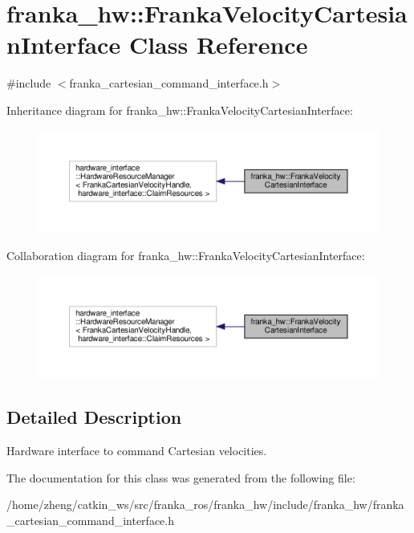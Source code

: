 \hypertarget{classfranka__hw_1_1_franka_velocity_cartesian_interface}{}\section{franka\+\_\+hw\+:\+:Franka\+Velocity\+Cartesian\+Interface Class Reference}
\label{classfranka__hw_1_1_franka_velocity_cartesian_interface}


{\ttfamily \#include $<$franka\+\_\+cartesian\+\_\+command\+\_\+interface.\+h$>$}



Inheritance diagram for franka\+\_\+hw\+:\+:Franka\+Velocity\+Cartesian\+Interface\+:
\nopagebreak
\begin{figure}[H]
\begin{center}
\leavevmode
\includegraphics[width=350pt]{classfranka__hw_1_1_franka_velocity_cartesian_interface__inherit__graph}
\end{center}
\end{figure}


Collaboration diagram for franka\+\_\+hw\+:\+:Franka\+Velocity\+Cartesian\+Interface\+:
\nopagebreak
\begin{figure}[H]
\begin{center}
\leavevmode
\includegraphics[width=350pt]{classfranka__hw_1_1_franka_velocity_cartesian_interface__coll__graph}
\end{center}
\end{figure}


\subsection{Detailed Description}
Hardware interface to command Cartesian velocities. 

The documentation for this class was generated from the following file\+:\begin{DoxyCompactItemize}
\item 
/home/zheng/catkin\+\_\+ws/src/franka\+\_\+ros/franka\+\_\+hw/include/franka\+\_\+hw/franka\+\_\+cartesian\+\_\+command\+\_\+interface.\+h\end{DoxyCompactItemize}
